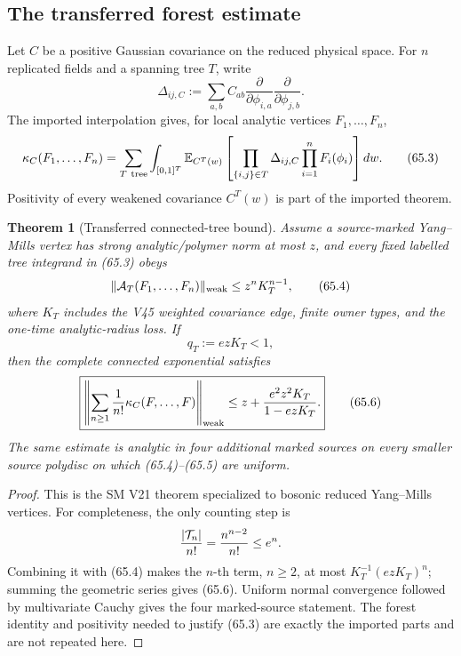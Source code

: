 \documentclass[11pt,oneside]{book}
\newtheorem{theorem}{Theorem}[chapter]
\theoremstyle{definition}
\theoremstyle{remark}
\begin{document}
\subsection{The transferred forest estimate}

Let \(C\) be a positive Gaussian covariance on the reduced physical
space.  For \(n\) replicated fields and a spanning tree \(T\), write
\[
 \Delta_{ij,C}:=\sum_{a,b}C_{ab}
 \frac{\partial}{\partial\phi_{i,a}}
 \frac{\partial}{\partial\phi_{j,b}}.                        \tag{65.2}
\]
The imported interpolation gives, for local analytic vertices
\(F_1,\ldots,F_n\),
\[
 \kappa_C(F_1,\ldots,F_n)
 =\sum_{T\ {\rm tree}}\int_{[0,1]^T}
 \mathbb E_{C^T(w)}
 \left[
  \prod_{\{i,j\}\in T}\Delta_{ij,C}
  \prod_{i=1}^nF_i(\phi_i)
 \right]dw.                                                   \tag{65.3}
\]
Positivity of every weakened covariance \(C^T(w)\) is part of the
imported theorem.

\begin{theorem}[Transferred connected-tree bound]
\label{thm:e8v65-transferred-tree}
Assume a source-marked Yang--Mills vertex has strong analytic/polymer
norm at most \(z\), and every fixed labelled tree integrand in
(65.3) obeys
\[
 \|{\cal A}_T(F_1,\ldots,F_n)\|_{\rm weak}
 \le z^nK_T^{n-1},                                           \tag{65.4}
\]
where \(K_T\) includes the V45 weighted covariance edge, finite
owner types, and the one-time analytic-radius loss.  If
\[
                         q_T:=ezK_T<1,                        \tag{65.5}
\]
then the complete connected exponential satisfies
\[
\boxed{
 \left\|\sum_{n\ge1}\frac1{n!}
 \kappa_C(F,\ldots,F)\right\|_{\rm weak}
 \le z+\frac{e^2z^2K_T}{1-ezK_T}.}                           \tag{65.6}
\]
The same estimate is analytic in four additional marked sources on
every smaller source polydisc on which (65.4)--(65.5) are uniform.
\end{theorem}

\begin{proof}
This is the SM V21 theorem specialized to bosonic reduced
Yang--Mills vertices.  For completeness, the only counting step is
\[
 \frac{|{\cal T}_n|}{n!}
 =\frac{n^{n-2}}{n!}\le e^n.
\]
Combining it with (65.4) makes the \(n\)-th term, \(n\ge2\), at
most \(K_T^{-1}(ezK_T)^n\); summing the geometric series gives
(65.6).  Uniform normal convergence followed by multivariate Cauchy
gives the four marked-source statement.  The forest identity and
positivity needed to justify (65.3) are exactly the imported parts
and are not repeated here.
\end{proof}
\end{document}

